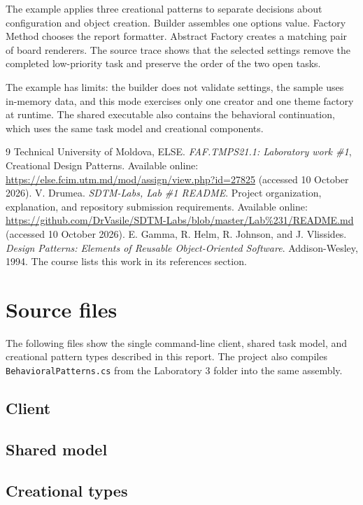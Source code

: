 \documentclass{utmreport}
\begin{document}
\utmconclusions
The example applies three creational patterns to separate decisions about configuration and object creation. Builder assembles one options value. Factory Method chooses the report formatter. Abstract Factory creates a matching pair of board renderers. The source trace shows that the selected settings remove the completed low-priority task and preserve the order of the two open tasks.

The example has limits: the builder does not validate settings, the sample uses in-memory data, and this mode exercises only one creator and one theme factory at runtime. The shared executable also contains the behavioral continuation, which uses the same task model and creational components.

\begin{thebibliography}{9}
 Technical University of Moldova, ELSE. \textit{FAF.TMPS21.1: Laboratory work \#1}, Creational Design Patterns. Available online: \url{https://else.fcim.utm.md/mod/assign/view.php?id=27825} (accessed 10 October 2026).
 V. Drumea. \textit{SDTM-Labs, Lab \#1 README}. Project organization, explanation, and repository submission requirements. Available online: \url{https://github.com/DrVasile/SDTM-Labs/blob/master/Lab%231/README.md} (accessed 10 October 2026).
 E. Gamma, R. Helm, R. Johnson, and J. Vlissides. \textit{Design Patterns: Elements of Reusable Object-Oriented Software}. Addison-Wesley, 1994. The course lists this work in its references section.
\end{thebibliography}

\appendix
\chapter{Source files}\label{app:source}
The following files show the single command-line client, shared task model, and creational pattern types described in this report. The project also compiles \texttt{BehavioralPatterns.cs} from the Laboratory 3 folder into the same assembly.
\section{Client}

\section{Shared model}

\section{Creational types}

\end{document}
